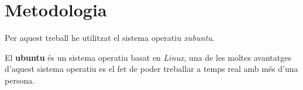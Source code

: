 \chapter{Metodologia}
Per aquest treball he utilitzat el sistema operatiu \textit{xubuntu}\cite{xubuntu}.
\vspace{0.3truecm}

El \textbf{ubuntu} és un sistema operatiu basat en \textit{Linux}, una de les moltes avantatges d'aquest sistema operatiu es el fet de poder treballar a temps real amb més d'una persona.
